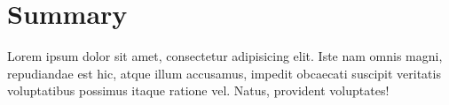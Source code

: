 \section{Summary}

Lorem ipsum dolor sit amet, consectetur adipisicing elit. Iste nam omnis magni, repudiandae est hic, atque illum accusamus, impedit obcaecati suscipit veritatis voluptatibus possimus itaque ratione vel. Natus, provident voluptates!